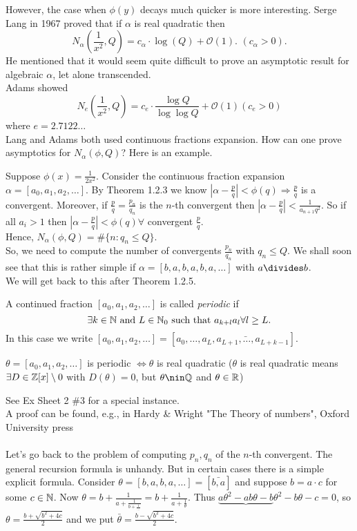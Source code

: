 \documentclass[NumTh.tex]{subfiles}
\begin{document}
However, the case when $\phi(y)$ decays much quicker is more interesting.
Serge Lang in 1967 proved that if $\alpha$ is real quadratic then
\[ N_\alpha(\frac{1}{x^2},Q) = c_\alpha \cdot \log(Q) + \mathcal{O}(1)\text{. } (c_\alpha > 0). \]
He mentioned that it would seem quite difficult to prove an asymptotic result for algebraic $\alpha$, let alone transcended.\\
Adams showed
\[ N_e(\frac{1}{x^2},Q) = c_e \cdot \frac{\log Q}{\log \log Q} + \mathcal{O}(1) (c_e > 0) \]
where $ e = 2.7122\dots$\\
Lang and Adams both used continuous fractions expansion. How can one prove asymptotics for $N_\alpha(\phi,Q)$?
Here is an example.

\begin{ex}
  Suppose $\phi(x) = \frac{1}{2x^2}$. Consider the continuous fraction expansion $\alpha = [a_0,a_1,a_2,\dots]$.
  By Theorem 1.2.3 we know $| \alpha - \frac{p}{q}| < \phi(q) \Rightarrow \frac{p}{q}$ is a convergent.
  Moreover, if $\frac{p}{q} = \frac{p_n}{q_n}$ is the $n$-th convergent then $|\alpha - \frac{p}{q}| < \frac{1}{a_{n+1} q^2}$.
  So if all $a_i > 1$ then $|\alpha - \frac{p}{q}| < \phi(q) \forall$ convergent $\frac{p}{q}$.\\
  Hence, $N_\alpha(\phi,Q) = \#\{n: q_n \leq Q \}$.\\
  So, we need to compute the number of convergents $\frac{p_n}{q_n}$ with $q_n \leq Q$. 
  We shall soon see that this is rather simple if $\alpha = [b,a,b,a,b,a,\dots]$ with $a \divides b$.\\
  We will get back to this after Theorem 1.2.5.
\end{ex}

A continued fraction $[a_0,a_1,a_2,\dots]$ is called \emph{periodic} if
\[ \exists k \in \mathbb{N}  \text{ and } L \in \mathbb{N}_0 \text{ such that } a_{k+l} a_l \forall l \geq L.\]
In this case we write $[a_0,a_1,a_2,\dots] = [a_0,\dots,\bar{a_L,a_{L+1},\dots,a_{L+k-1}}]$.

\begin{theorem}
  $\theta = [a_0,a_1,a_2,\dots]$ is periodic $\iff \theta$ is real quadratic ($\theta$ is real quadratic means $\exists D \in \mathbb{Z}[x]\setminus 0$ with $D(\theta) = 0$, but $\theta \nin \Q$ and $\theta \in \mathbb{R}$)
\end{theorem}

See Ex Sheet 2 \#3 for a special instance.\\
A proof can be found, e.g., in Hardy \& Wright "The Theory of numbers", Oxford University press\\
\\
Let's go back to the problem of computing  $p_n, q_n$ of the $n$-th convergent.
The general recursion formula is unhandy.
But in certain cases there is a simple explicit formula. 
Consider $\theta = [b,a,b,a,\dots] = [\bar{b,a}]$ and suppose $b = a \cdot c$ for some $c \in \mathbb{N}$.
Now $\theta = b + \frac{1}{a + \frac{1}{b + \frac{1}{\dots}}} = b + \frac{1}{a + \frac{1}{\theta}}$.
Thus $\underbrace{a \theta^2 - ab\theta - b}{\theta^2 - b\theta -c} = 0$, so $\theta = \frac{b + \sqrt{b^2+4c}}{2}$
and we put $\bar{\theta} = \frac{b - \sqrt{b^2+4c}}{2}$.
\end{document}
